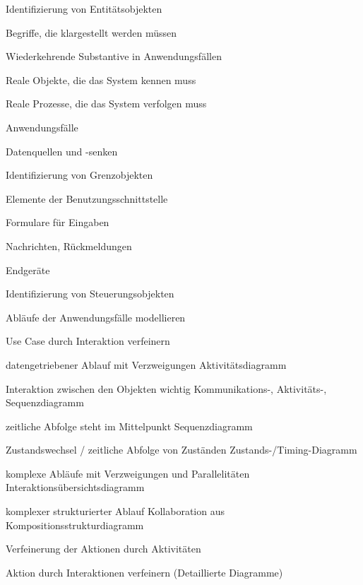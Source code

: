 \documentclass[a4paper]{article}
\begin{document}
\begin{multicols}{3}
\begin{itemize*}
\begin{description*}
  \end{description*}
  \item Identifizierung von Entitätsobjekten
  \begin{itemize*}
    \item Begriffe, die klargestellt werden müssen
    \item Wiederkehrende Substantive in Anwendungsfällen
    \item Reale Objekte, die das System kennen muss
    \item Reale Prozesse, die das System verfolgen muss
    \item Anwendungsfälle
    \item Datenquellen und -senken
  \end{itemize*}
  \item Identifizierung von Grenzobjekten
  \begin{itemize*}
    \item Elemente der Benutzungsschnittstelle
    \item Formulare für Eingaben
    \item Nachrichten, Rückmeldungen
    \item Endgeräte
  \end{itemize*}
  \item Identifizierung von Steuerungsobjekten
    \item Abläufe der Anwendungsfälle modellieren
    \item Use Case durch Interaktion verfeinern
    \begin{description*}
      \item[datengetriebener Ablauf mit Verzweigungen] Aktivitätsdiagramm
      \item[Interaktion zwischen den Objekten wichtig] Kommunikations-, Aktivitäts-, Sequenzdiagramm
      \item[zeitliche Abfolge steht im Mittelpunkt] Sequenzdiagramm
      \item[Zustandswechsel / zeitliche Abfolge von Zuständen] Zustands-/Timing-Diagramm
      \item[komplexe Abläufe mit Verzweigungen und Parallelitäten] Interaktionsübersichtsdiagramm
      \item[komplexer strukturierter Ablauf] Kollaboration aus Kompositionsstrukturdiagramm
    \end{description*}
    \item Verfeinerung der Aktionen durch Aktivitäten
    \item Aktion durch Interaktionen verfeinern (Detaillierte Diagramme)

\end{itemize*}
\end{multicols}
\end{document}
